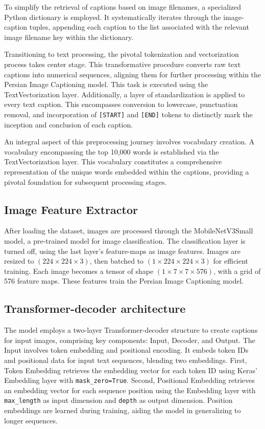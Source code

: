 \documentclass[lettersize,journal]{IEEEtran}
\begin{document}
To simplify the retrieval of captions based on image filenames, a specialized Python dictionary is employed. It systematically iterates through the image-caption tuples, appending each caption to the list associated with the relevant image filename key within the dictionary.

Transitioning to text processing, the pivotal tokenization and vectorization process takes center stage. This transformative procedure converts raw text captions into numerical sequences, aligning them for further processing within the Persian Image Captioning model. This task is executed using the TextVectorization layer. Additionally, a layer of standardization is applied to every text caption. This encompasses conversion to lowercase, punctuation removal, and incorporation of \texttt{[START]} and \texttt{[END]} tokens to distinctly mark the inception and conclusion of each caption.

An integral aspect of this preprocessing journey involves vocabulary creation. A vocabulary encompassing the top 10,000 words is established via the TextVectorization layer. This vocabulary constitutes a comprehensive representation of the unique words embedded within the captions, providing a pivotal foundation for subsequent processing stages.

\subsection{Image Feature Extractor}

After loading the dataset, images are processed through the MobileNetV3Small model, a pre-trained model for image classification. The classification layer is turned off, using the last layer's feature-maps as image features. Images are resized to $(224 \times 224 \times 3)$, then batched to $(1 \times 224 \times 224 \times 3)$ for efficient training. Each image becomes a tensor of shape $(1 \times 7 \times 7 \times 576)$, with a grid of 576 feature maps. These features train the Persian Image Captioning model.

\subsection{Transformer-decoder architecture}

The model employs a two-layer Transformer-decoder structure to create captions for input images, comprising key components: Input, Decoder, and Output. The Input involves token embedding and positional encoding. It embeds token IDs and positional data for input text sequences, blending two embeddings. First, Token Embedding retrieves the embedding vector for each token ID using Keras' Embedding layer with \texttt{mask\_zero=True}. Second, Positional Embedding retrieves an embedding vector for each sequence position using the Embedding layer with \texttt{max\_length} as input dimension and \texttt{depth} as output dimension. Position embeddings are learned during training, aiding the model in generalizing to longer sequences.
\end{document}
